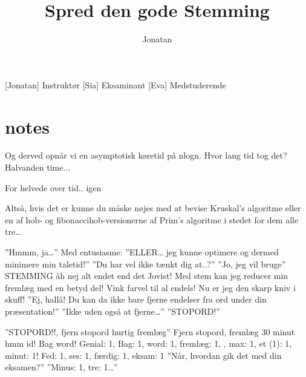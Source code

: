 \documentclass[a4paper,11pt]{article}
\title{Spred den gode Stemming}
\author{Jonatan}
\begin{document}
\maketitle

\begin{roles}
[Jonatan] Instruktør
[Sia] Eksaminant
[Eva] Medstuderende
\end{roles}

\begin{props}
\end{props}

\section*{notes}


\begin{sketch}
 Og derved opnår vi en asymptotisk køretid på nlogn. Hvor lang tid tog det?
  Halvanden time...

 For helvede over tid.. igen

  Altså, hvis det er kunne du måske nøjes med at bevise Kruskal’s algoritme eller en af hob- og fibonaccihob-versionerne af Prim’s algoritme i stedet for dem alle tre…

  ”Hmmm, ja…”
Med entusiasme:
”ELLER… jeg kunne optimere og dermed minimere min taletid!”
  ”Du har vel ikke tænkt dig at..?”
               ”Jo, jeg vil bruge”   STEMMING
  åh nej alt endet end det
 Jovist! Med stem kan jeg reducer min fremlæg med en betyd del! Vink farvel til al endels! Nu er jeg den skarp kniv i skuff!
               ”Ej, hallå! Du kan da ikke bare fjerne endelser fra ord under din præsentation!”
               ”Ikke uden også at fjerne…”
               ”STOPORD!”

      ”STOPORD!!, fjern stopord hurtig fremlæg”
 Fjern stopord, fremlæg 30 minut
  hmm
 id! Bag word!
 Genial: 1, Bag: 1, word: 1, fremlæg: 1, , max: 1, et (1): 1, minut: 1!
 Fed: 1, ses: 1, færdig: 1, eksam: 1
    ”Når, hvordan gik det med din eksamen?”
        ”Minus: 1, tre: 1…”
\end{sketch}
\end{document}
